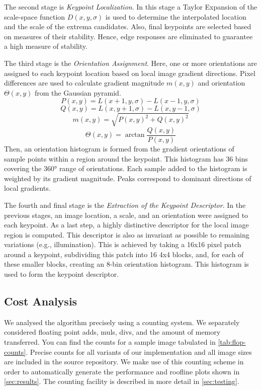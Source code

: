 \documentclass[letterpaper]{article}
\begin{document}
The second stage is \emph{Keypoint Localization}. In this stage a Taylor Expansion of the scale-space function $D(x,y,\sigma)$ is used to determine the interpolated location and the scale of the extrema candidates. Also, final keypoints are selected based on measures of their stability. Hence, edge responses are eliminated to guarantee a high measure of stability.

The third stage is the \emph{Orientation Assignment}. Here, one or more orientations are assigned to each keypoint location based on local image gradient directions. Pixel differences are used to calculate gradient magnitude $m(x,y)$ and orientation $\Theta(x,y)$ from the Gaussian pyramid.
\begin{equation}
    P(x,y)=L(x+1,y,\sigma) - L(x-1,y,\sigma)
\end{equation}
\begin{equation}
    Q(x,y)=L(x,y+1,\sigma)-L(x,y-1,\sigma)
\end{equation}
\begin{equation}
    m(x,y)=\sqrt{P(x,y)^2+Q(x,y)^2}
\end{equation}
\begin{equation}
    \Theta(x,y)=\arctan{\frac{Q(x,y)}{P(x,y)}}
\end{equation}
Then, an orientation histogram is formed from the gradient orientations of sample points within a region around the keypoint. This histogram has 36 bins covering the 360° range of orientations. Each sample added to the histogram is weighted by its gradient magnitude. Peaks correspond to dominant directions of local gradients.

The fourth and final stage is the \emph{Extraction of the Keypoint Descriptor}. In the previous stages, an image location, a scale, and an orientation were assigned to each keypoint. As a last step, a highly distinctive descriptor for the local image region is computed. This descriptor is also as invariant as possible to remaining variations (e.g., illumination). This is achieved by taking a 16x16 pixel patch around a keypoint, subdividing this patch into 16 4x4 blocks, and, for each of these smaller blocks, creating an 8-bin orientation histogram. This histogram is used to form the keypoint descriptor.

\subsection*{Cost Analysis}
We analysed the algorithm precisely using a counting system. We separately considered floating point adds, muls, divs, and the amount of memory transferred. You can find the counts for a sample image tabulated in \autoref{tab:flop-counts}. Precise counts for all variants of our implementation and all image sizes are included in the source repository\cite{ethsift}. We make use of this counting scheme in order to automatically generate the performance and roofline plots shown in \autoref{sec:results}. The counting facility is described in more detail in \autoref{sec:testing}.
\end{document}
